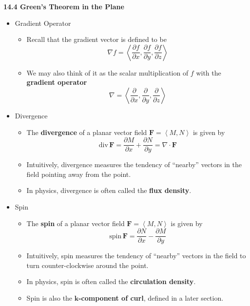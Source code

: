 \documentclass[12pt]{article}
\theoremstyle{plain}
\theoremstyle{definition}
\theoremstyle{remark}
\newcommand{\vect}[1]{\mathbf{#1}}
\newcommand{\veck}{\mathbf{k}}
\renewcommand{\div}{\textrm{div}\,}
\newcommand{\spin}{\textrm{spin}\,}
\begin{document}
	\newpage
	
	\centerline{\bf 14.4 Green's Theorem in the Plane}
	
	\begin{itemize}
		
	\item Gradient Operator
	
		\begin{itemize}
		\item Recall that the gradient vector is defined to be \[\nabla f = \left<\frac{\partial f}{\partial x},\frac{\partial f}{\partial y},\frac{\partial f}{\partial z}\right>\]
		\item We may also think of it as the scalar multiplication of $f$ with the \textbf{gradient operator} \[\nabla = \left<\frac{\partial}{\partial x},\frac{\partial}{\partial y},\frac{\partial}{\partial z}\right>\]
		\end{itemize}
		
	\item Divergence
	
		\begin{itemize}
		\item The \textbf{divergence} of a planar vector field $\vect{F}=\left<M,N\right>$ is given by \[ \div \vect{F} = \frac{\partial M}{\partial x}+\frac{\partial N}{\partial y} = \nabla\cdot\vect{F} \]
		\item Intuitively, divergence measures the tendency of ``nearby'' vectors in the field pointing away from the point.
		\item In physics, divergence is often called the \textbf{flux density}.
		\end{itemize}
	
	\item Spin
	
		\begin{itemize}
		\item The \textbf{spin} of a planar vector field $\vect{F}=\left<M,N\right>$ is given by \[ \spin \vect{F} = \frac{\partial N}{\partial x}-\frac{\partial M}{\partial y} \]
		\item Intuitively, spin measures the tendency of ``nearby'' vectors in the field to turn counter-clockwise around the point.
		\item In physics, spin is often called the \textbf{circulation density}.
		\item Spin is also the \textbf{$\veck$-component of curl}, defined in a later section.
		\end{itemize}
		

\end{itemize}
\end{document}
